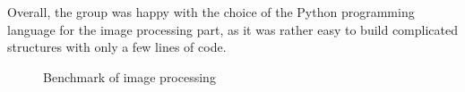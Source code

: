 \begin{itemize}
Overall, the group was happy with the choice of the Python programming language for the image processing part, as it was rather easy to build complicated structures with only a few lines of code.

\begin{figure}[ht]
	\centering
	\quad
	\caption{Benchmark of image processing}
	\label{fig:benchmark_image_processing}
\end{figure}
\end{itemize}